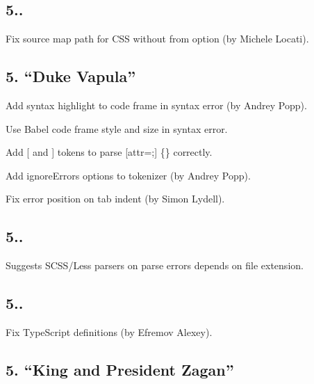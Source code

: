 \subsection*{5..}


\begin{DoxyItemize}
\item Fix source map path for C\+SS without {\ttfamily from} option (by Michele Locati).
\end{DoxyItemize}

\subsection*{5. “\+Duke Vapula”}


\begin{DoxyItemize}
\item Add syntax highlight to code frame in syntax error (by Andrey Popp).
\item Use Babel code frame style and size in syntax error.
\item Add {\ttfamily \mbox{[}} and {\ttfamily \mbox{]}} tokens to parse {\ttfamily \mbox{[}attr=;\mbox{]} \{\}} correctly.
\item Add {\ttfamily ignore\+Errors} options to tokenizer (by Andrey Popp).
\item Fix error position on tab indent (by Simon Lydell).
\end{DoxyItemize}

\subsection*{5..}


\begin{DoxyItemize}
\item Suggests S\+C\+S\+S/\+Less parsers on parse errors depends on file extension.
\end{DoxyItemize}

\subsection*{5..}


\begin{DoxyItemize}
\item Fix Type\+Script definitions (by Efremov Alexey).
\end{DoxyItemize}

\subsection*{5. “\+King and President Zagan”}



